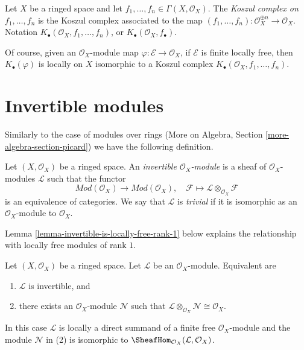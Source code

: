 \begin{definition}
\label{definition-koszul-complex}
Let $X$ be a ringed space and let
$f_1, \ldots, f_n \in \Gamma(X, \mathcal{O}_X)$. The
{\it Koszul complex on $f_1, \ldots, f_n$} is the Koszul complex
associated to the map
$(f_1, \ldots, f_n) : \mathcal{O}_X^{\oplus n} \to \mathcal{O}_X$.
Notation $K_\bullet(\mathcal{O}_X, f_1, \ldots, f_n)$,
or $K_\bullet(\mathcal{O}_X, f_\bullet)$.
\end{definition}

\noindent
Of course, given an $\mathcal{O}_X$-module map
$\varphi : \mathcal{E} \to \mathcal{O}_X$,
if $\mathcal{E}$ is finite locally free, then
$K_\bullet(\varphi)$ is locally on $X$ isomorphic to a Koszul complex
$K_\bullet(\mathcal{O}_X, f_1, \ldots, f_n)$.



\section{Invertible modules}
\label{section-invertible}

\noindent
Similarly to the case of modules over rings
(More on Algebra, Section \ref{more-algebra-section-picard})
we have the following definition.

\begin{definition}
\label{definition-invertible}
Let $(X, \mathcal{O}_X)$ be a ringed space. An
{\it invertible $\mathcal{O}_X$-module} is a sheaf
of $\mathcal{O}_X$-modules $\mathcal{L}$ such that
the functor
$$
\textit{Mod}(\mathcal{O}_X) \longrightarrow \textit{Mod}(\mathcal{O}_X),\quad
\mathcal{F} \longmapsto \mathcal{L} \otimes_{\mathcal{O}_X} \mathcal{F}
$$
is an equivalence of categories. We say that $\mathcal{L}$ is
{\it trivial} if it is isomorphic as an $\mathcal{O}_X$-module
to $\mathcal{O}_X$.
\end{definition}

\noindent
Lemma \ref{lemma-invertible-is-locally-free-rank-1}
below explains the relationship with locally free modules
of rank $1$.

\begin{lemma}
\label{lemma-invertible}
Let $(X, \mathcal{O}_X)$ be a ringed space. Let $\mathcal{L}$
be an $\mathcal{O}_X$-module. Equivalent are
\begin{enumerate}
\item $\mathcal{L}$ is invertible, and
\item there exists an $\mathcal{O}_X$-module $\mathcal{N}$
such that
$\mathcal{L} \otimes_{\mathcal{O}_X} \mathcal{N} \cong \mathcal{O}_X$.
\end{enumerate}
In this case $\mathcal{L}$ is locally a direct summand of a finite free
$\mathcal{O}_X$-module and the module $\mathcal{N}$ in (2) is isomorphic to
$\SheafHom_{\mathcal{O}_X}(\mathcal{L}, \mathcal{O}_X)$.
\end{lemma}

